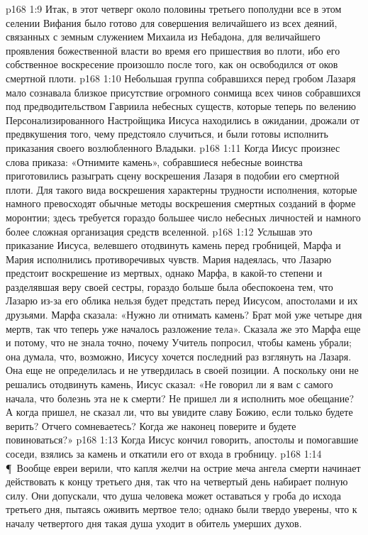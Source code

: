 \vs p168 1:9 Итак, в этот четверг около половины третьего пополудни все в этом селении Вифания было готово для совершения величайшего из всех деяний, связанных с земным служением Михаила из Небадона, для величайшего проявления божественной власти во время его пришествия во плоти, ибо его собственное воскресение произошло после того, как он освободился от оков смертной плоти.
\vs p168 1:10 Небольшая группа собравшихся перед гробом Лазаря мало сознавала близкое присутствие огромного сонмища всех чинов собравшихся под предводительством Гавриила небесных существ, которые теперь по велению Персонализированного Настройщика Иисуса находились в ожидании, дрожали от предвкушения того, чему предстояло случиться, и были готовы исполнить приказания своего возлюбленного Владыки.
\vs p168 1:11 Когда Иисус произнес слова приказа: «Отнимите камень», собравшиеся небесные воинства приготовились разыграть сцену воскрешения Лазаря в подобии его смертной плоти. Для такого вида воскрешения характерны трудности исполнения, которые намного превосходят обычные методы воскрешения смертных созданий в форме моронтии; здесь требуется гораздо большее число небесных личностей и намного более сложная организация средств вселенной.
\vs p168 1:12 Услышав это приказание Иисуса, велевшего отодвинуть камень перед гробницей, Марфа и Мария исполнились противоречивых чувств. Мария надеялась, что Лазарю предстоит воскрешение из мертвых, однако Марфа, в какой\hyp{}то степени и разделявшая веру своей сестры, гораздо больше была обеспокоена тем, что Лазарю из\hyp{}за его облика нельзя будет предстать перед Иисусом, апостолами и их друзьями. Марфа сказала: «Нужно ли отнимать камень? Брат мой уже четыре дня мертв, так что теперь уже началось разложение тела». Сказала же это Марфа еще и потому, что не знала точно, почему Учитель попросил, чтобы камень убрали; она думала, что, возможно, Иисусу хочется последний раз взглянуть на Лазаря. Она еще не определилась и не утвердилась в своей позиции. А поскольку они не решались отодвинуть камень, Иисус сказал: «Не говорил ли я вам с самого начала, что болезнь эта не к смерти? Не пришел ли я исполнить мое обещание? А когда пришел, не сказал ли, что вы увидите славу Божию, если только будете верить? Отчего сомневаетесь? Когда же наконец поверите и будете повиноваться?»
\vs p168 1:13 Когда Иисус кончил говорить, апостолы и помогавшие соседи, взялись за камень и откатили его от входа в гробницу.
\vs p168 1:14 \P\ Вообще евреи верили, что капля желчи на острие меча ангела смерти начинает действовать к концу третьего дня, так что на четвертый день набирает полную силу. Они допускали, что душа человека может оставаться у гроба до исхода третьего дня, пытаясь оживить мертвое тело; однако были твердо уверены, что к началу четвертого дня такая душа уходит в обитель умерших духов.
